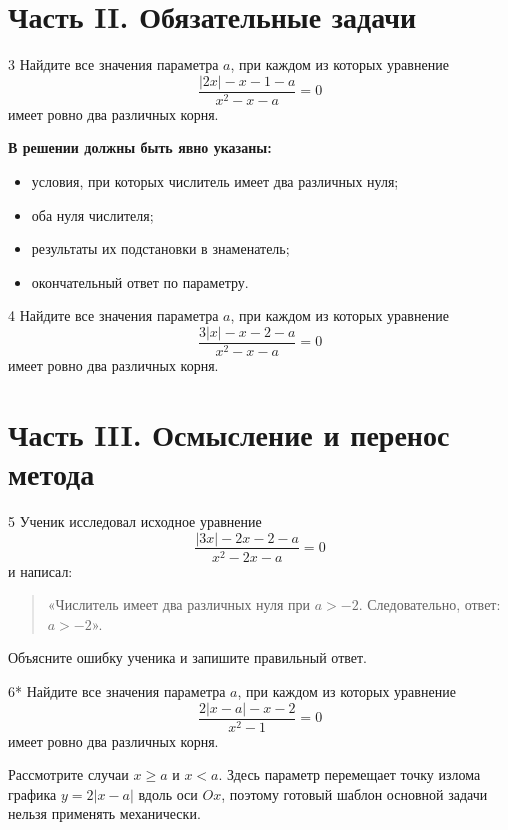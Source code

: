 \section*{Часть II. Обязательные задачи}

\begin{homeworktask}{3}
  Найдите все значения параметра \(a\), при каждом из которых уравнение
  \[
    \frac{|2x|-x-1-a}{x^2-x-a}=0
  \]
  имеет ровно два различных корня.

  \textbf{В решении должны быть явно указаны:}
  \begin{itemize}[itemsep=0.15em,topsep=0.25em]
    \item условия, при которых числитель имеет два различных нуля;
    \item оба нуля числителя;
    \item результаты их подстановки в знаменатель;
    \item окончательный ответ по параметру.
  \end{itemize}
\end{homeworktask}
\shortanswerline

\newpage
\begin{homeworktask}{4}
  Найдите все значения параметра \(a\), при каждом из которых уравнение
  \[
    \frac{3|x|-x-2-a}{x^2-x-a}=0
  \]
  имеет ровно два различных корня.
\end{homeworktask}
\solutionmap

\section*{Часть III. Осмысление и перенос метода}

\begin{homeworktask}{5}
  Ученик исследовал исходное уравнение
  \[
    \frac{|3x|-2x-2-a}{x^2-2x-a}=0
  \]
  и написал:

  \begin{quote}
    «Числитель имеет два различных нуля при \(a>-2\). Следовательно,
    ответ: \(a>-2\)».
  \end{quote}

  Объясните ошибку ученика и запишите правильный ответ.
\end{homeworktask}
\answerspace{18mm}

\newpage
\begin{homeworktask}{6*}
  Найдите все значения параметра \(a\), при каждом из которых уравнение
  \[
    \frac{2|x-a|-x-2}{x^2-1}=0
  \]
  имеет ровно два различных корня.

  \begin{hintbox}
    Рассмотрите случаи \(x\ge a\) и \(x<a\). Здесь параметр перемещает
    точку излома графика \(y=2|x-a|\) вдоль оси \(Ox\), поэтому готовый
    шаблон основной задачи нельзя применять механически.
  \end{hintbox}
\end{homeworktask}
\solutionmap

